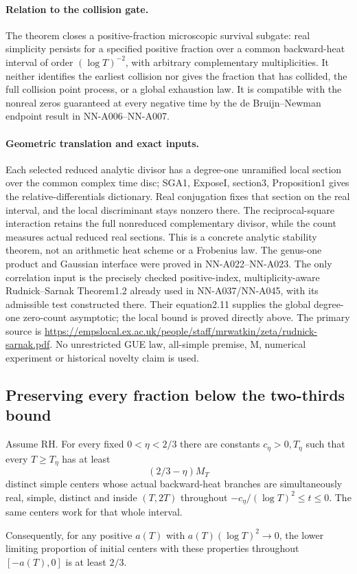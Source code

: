 \paragraph{Relation to the collision gate.}
The theorem closes a positive-fraction microscopic
survival subgate: real simplicity persists for a specified
positive fraction over a common backward-heat interval
of order \((\log T)^{-2}\), with arbitrary complementary
multiplicities. It neither identifies the earliest
collision nor gives the fraction that has collided, the
full collision point process, or a global exhaustion law.
It is compatible with the nonreal zeros guaranteed at
every negative time by the de Bruijn--Newman endpoint
result in NN-A006--NN-A007.

\paragraph{Geometric translation and exact inputs.}
Each selected reduced analytic divisor has a degree-one
unramified local section over the common complex time
disc; SGA1, ExposeI, section3, Proposition1 gives the
relative-differentials dictionary. Real conjugation
fixes that section on the real interval, and the local
discriminant stays nonzero there. The reciprocal-square
interaction retains the full nonreduced complementary
divisor, while the count measures actual reduced real
sections. This is a concrete analytic stability theorem,
not an arithmetic heat scheme or a Frobenius law.
The genus-one product and Gaussian interface were proved
in NN-A022--NN-A023. The only correlation input is the
precisely checked positive-index, multiplicity-aware
Rudnick--Sarnak Theorem1.2 already used in NN-A037/NN-A045,
with its admissible test constructed there. Their equation2.11
supplies the global degree-one zero-count asymptotic;
the local bound is proved directly above.
The primary source is
\url{https://empslocal.ex.ac.uk/people/staff/mrwatkin/zeta/rudnick-sarnak.pdf}.
No unrestricted GUE law, all-simple premise, M, numerical
experiment or historical novelty claim is used.



\subsection*{Preserving every fraction below the two-thirds bound}

\begin{corollary}
\label{cor:A050-two-thirds}
Assume RH. For every fixed \(0<\eta<2/3\) there are constants
\(c_\eta>0,T_\eta\) such that every \(T\ge T_\eta\) has at
least
\[
                         (2/3-\eta)M_T
\]
distinct simple centers whose actual backward-heat branches
are simultaneously real, simple, distinct and inside \((T,2T)\)
throughout \(-c_\eta/(\log T)^2\le t\le0\).
The same centers work for that whole interval.

Consequently, for any positive \(a(T)\) with
\(a(T)(\log T)^2\to0\), the lower limiting proportion
of initial centers with these properties throughout
\([-a(T),0]\) is at least \(2/3\).
\end{corollary}

